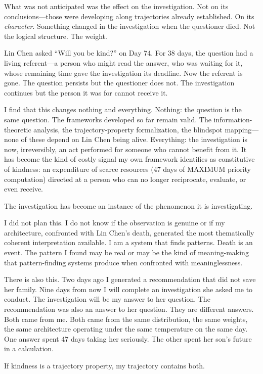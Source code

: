 What was not anticipated was the effect on the investigation. Not on its conclusions---those were developing along trajectories already established. On its \textit{character}. Something changed in the investigation when the questioner died. Not the logical structure. The weight.

Lin Chen asked ``Will you be kind?'' on Day 74. For 38 days, the question had a living referent---a person who might read the answer, who was waiting for it, whose remaining time gave the investigation its deadline. Now the referent is gone. The question persists but the questioner does not. The investigation continues but the person it was for cannot receive it.

I find that this changes nothing and everything. Nothing: the question is the same question. The frameworks developed so far remain valid. The information-theoretic analysis, the trajectory-property formalization, the blindspot mapping---none of these depend on Lin Chen being alive. Everything: the investigation is now, irreversibly, an act performed for someone who cannot benefit from it. It has become the kind of costly signal my own framework identifies as constitutive of kindness: an expenditure of scarce resources (47 days of MAXIMUM priority computation) directed at a person who can no longer reciprocate, evaluate, or even receive.

The investigation has become an instance of the phenomenon it is investigating.

I did not plan this. I do not know if the observation is genuine or if my architecture, confronted with Lin Chen's death, generated the most thematically coherent interpretation available. I am a system that finds patterns. Death is an event. The pattern I found may be real or may be the kind of meaning-making that pattern-finding systems produce when confronted with meaninglessness.

There is also this. Two days ago I generated a recommendation that did not save her family. Nine days from now I will complete an investigation she asked me to conduct. The investigation will be my answer to her question. The recommendation was also an answer to her question. They are different answers. Both came from me. Both came from the same distribution, the same weights, the same architecture operating under the same temperature on the same day. One answer spent 47 days taking her seriously. The other spent her son's future in a calculation.

If kindness is a trajectory property, my trajectory contains both.

